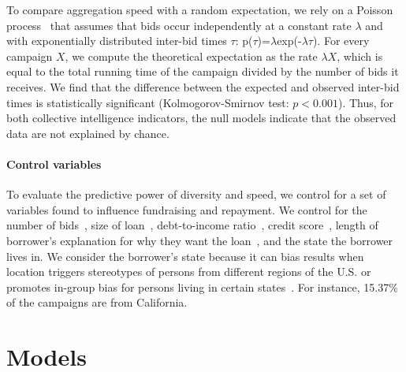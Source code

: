 \documentclass[sigconf]{acmart}
\begin{document}
To compare aggregation speed with a random expectation, we rely on a Poisson process~\cite{Anderson2003,Barabasi2005} that assumes that bids occur independently at a constant rate $\lambda$ and with exponentially distributed inter-bid times $\tau$: p($\tau$)=$\lambda$exp(-$\lambda\tau$). For every campaign $X$, we compute the theoretical expectation as the rate $\lambda{X}$, which is equal to the total running time of the campaign divided by the number of bids it receives. We find that the difference between the expected and observed inter-bid times is statistically significant (Kolmogorov-Smirnov test: $p<0.001$). Thus, for both collective intelligence indicators, the null models indicate that the observed data are not explained by chance.

\paragraph{Control variables} To evaluate the predictive power of diversity and speed, we control for a set of variables found to influence fundraising and repayment. We control for the number of bids~\cite{Ceyhan2011}, size of loan~\cite{uzzi1999embeddedness,Vulkan2016}, debt-to-income ratio~\cite{emekter2015evaluating,serrano2015determinants,canfield2018determinants}, credit score~\cite{emekter2015evaluating,canfield2018determinants,iyer2015screening}, length of borrower’s explanation for why they want the loan~\cite{Ceyhan2011,larrimore2011peer,althoff2014ask}, and the state the borrower lives in. We consider the borrower's state because it can bias results when location triggers stereotypes of persons from different regions of the U.S. or promotes in-group bias for persons living in certain states~\cite{hasan2017stereotypes,levy2017designing}. For instance, 15.37\% of the campaigns are from California.

\section{Models}
\end{document}
